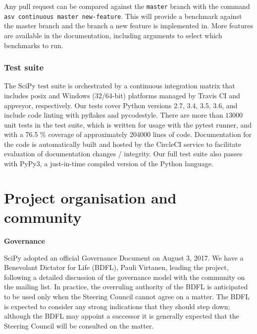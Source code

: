 \documentclass[fleqn,10pt]{wlscirep}
\begin{document}
   Any pull request can be compared against the \texttt{master} branch with the command \texttt{asv continuous master new-feature}. This will provide a benchmark against the master branch and the branch a new feature is implemented in. More features are available in the documentation, including arguments to select which benchmarks to run.

    \subsubsection*{Test suite}
    The SciPy test suite is orchestrated by a continuous integration matrix
    that includes posix and Windows (32/64-bit) platforms managed by Travis CI and appveyor,
    respectively. Our tests cover Python versions 2.7, 3.4, 3.5, 3.6, and include
    code linting with pyflakes and pycodestyle. There are more than $13000$ unit
    tests in the test suite, which is written for usage with the pytest runner, and
    with a 76.5 \% coverage of approximately $204000$ lines
    of code. Documentation for the code is automatically built and hosted by the
    CircleCI service to facilitate evaluation of documentation changes / integrity.
    Our full test suite also passes with PyPy3, a just-in-time compiled version
    of the Python language.


\section*{Project organisation and community}

\textbf{Governance}

SciPy adopted an official Governance Document on August 3,
2017\cite{SciPyProjectGovernance}.
We have a Benevolant Dictator for Life (BDFL), Pauli Virtanen, leading the
project, following a detailed discussion of the governance model with the
community on the mailing list.  In practice, the overruling authority of the BDFL
is anticipated to be used only when the Steering Council cannot agree on a matter.
The BDFL is expected to consider any strong indications that they should step down;
although the BDFL may appoint a successor it is generally expected that the Steering
Council will be consulted on the matter.
\end{document}
